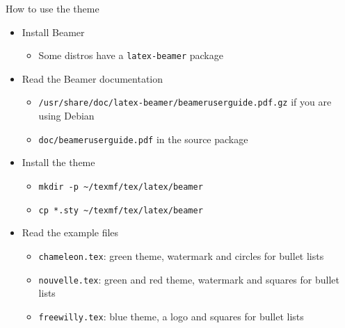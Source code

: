 \begin{frame}[t,fragile]{How to use the theme}
\begin{itemize}
\item Install Beamer
  \begin{itemize}
  \item Some distros have a \verb!latex-beamer! package
  \end{itemize}
\item Read the Beamer documentation
  \begin{itemize}
  \item \verb!/usr/share/doc/latex-beamer/beameruserguide.pdf.gz! if you are
        using Debian
  \item \verb!doc/beameruserguide.pdf! in the source package
  \end{itemize}
\item Install the theme
  \begin{itemize}
  \item \verb!mkdir -p ~/texmf/tex/latex/beamer!\\
  \item \verb!cp *.sty ~/texmf/tex/latex/beamer!
  \end{itemize}
\item Read the example files
  \begin{itemize}
  \item \verb!chameleon.tex!: green theme, watermark and circles for bullet
        lists
  \item \verb!nouvelle.tex!: green and red theme, watermark and squares for
        bullet lists
  \item \verb!freewilly.tex!: blue theme, a logo and squares for bullet lists
  \end{itemize}
\end{itemize}
\end{frame}

